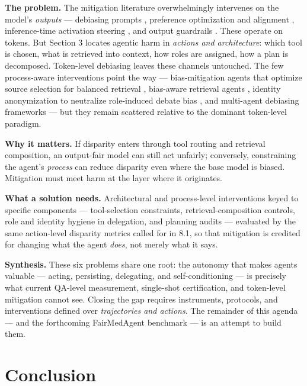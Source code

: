 \documentclass[sigconf,nonacm]{acmart}
\begin{document}
\textbf{The problem.} The mitigation literature overwhelmingly intervenes on the model's \emph{outputs} — debiasing prompts \cite{furniturewala2024thinking,li2024prompting}, preference optimization and alignment \cite{allam2024biasdpo,bai2022constitutional}, inference-time activation steering \cite{li2025fairsteer}, and output guardrails \cite{dong2024building}. These operate on tokens. But Section 3 locates agentic harm in \emph{actions and architecture}: which tool is chosen, what is retrieved into context, how roles are assigned, how a plan is decomposed. Token-level debiasing leaves these channels untouched. The few process-aware interventions point the way — bias-mitigation agents that optimize source selection for balanced retrieval \cite{singh2025biasb}, bias-aware retrieval agents \cite{singh2025bias}, identity anonymization to neutralize role-induced debate bias \cite{choi2025identity}, and multi-agent debiasing frameworks \cite{owens2024multi,xu2024mitigating} — but they remain scattered relative to the dominant token-level paradigm.

\textbf{Why it matters.} If disparity enters through tool routing and retrieval composition, an output-fair model can still act unfairly; conversely, constraining the agent's \emph{process} can reduce disparity even where the base model is biased. Mitigation must meet harm at the layer where it originates.

\textbf{What a solution needs.} Architectural and process-level interventions keyed to specific components — tool-selection constraints, retrieval-composition controls, role and identity hygiene in delegation, and planning audits — evaluated by the same action-level disparity metrics called for in 8.1, so that mitigation is credited for changing what the agent \emph{does}, not merely what it says.


\textbf{Synthesis.} These six problems share one root: the autonomy that makes agents valuable — acting, persisting, delegating, and self-conditioning — is precisely what current QA-level measurement, single-shot certification, and token-level mitigation cannot see. Closing the gap requires instruments, protocols, and interventions defined over \emph{trajectories and actions}. The remainder of this agenda — and the forthcoming FairMedAgent benchmark — is an attempt to build them.



\section{Conclusion}
\end{document}
